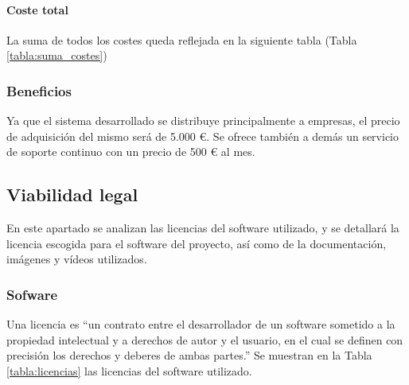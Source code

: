 \paragraph{Coste total}

La suma de todos los costes queda reflejada en la siguiente tabla (Tabla \ref{tabla:suma_costes})


\subsubsection{Beneficios}

Ya que el sistema desarrollado se distribuye principalmente a empresas, el precio de adquisición del
mismo será de 5.000 €. Se ofrece también a demás un servicio de soporte continuo con un precio de 
500 € al mes.


\subsection{Viabilidad legal}

En este apartado se analizan las licencias del software utilizado, y se detallará la licencia 
escogida para el software del proyecto, así como de la documentación, imágenes y vídeos utilizados.

\subsubsection{Sofware}

Una licencia es ``un contrato entre el desarrollador de un software sometido a la propiedad
intelectual y a derechos de autor y el usuario, en el cual se definen con precisión los 
derechos y deberes de ambas partes.'' \cite{labrador2012tipos}
Se muestran en la Tabla \ref{tabla:licencias} las licencias del software utilizado.


